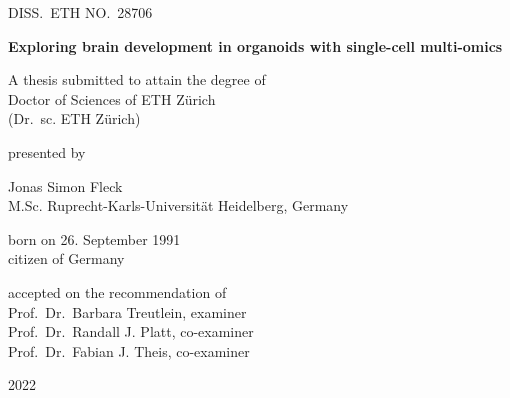 \begin{titlepage}
\centering

{DISS.\ ETH NO.\ 28706}\\

\vspace{2cm}

{\bfseries\sffamily\LARGE
Exploring brain development in organoids with single-cell multi-omics
}

\vspace{2cm}

{\large A thesis submitted to attain the degree of}\\
{\sc \large Doctor of Sciences} {\large of} {\sc \large ETH Zürich}\\
{\large(Dr.\ sc. ETH Zürich)}\\


\vspace{1cm}

{\large presented by}\\

\vspace{0.3cm}

{\sc \large Jonas Simon Fleck}\\
{\large M.Sc. Ruprecht-Karls-Universität Heidelberg, Germany\\}

\vspace{1cm}

{\large 
born on 26. September 1991\\
citizen of Germany\\
}

\vspace{2cm}

{\large
accepted on the recommendation of\\
Prof.\ Dr.\ Barbara Treutlein, examiner\\
Prof.\ Dr.\ Randall J. Platt, co-examiner\\
Prof.\ Dr.\ Fabian J. Theis, co-examiner\\
}

\vspace{2cm}

{\large
2022
}
	
\end{titlepage}